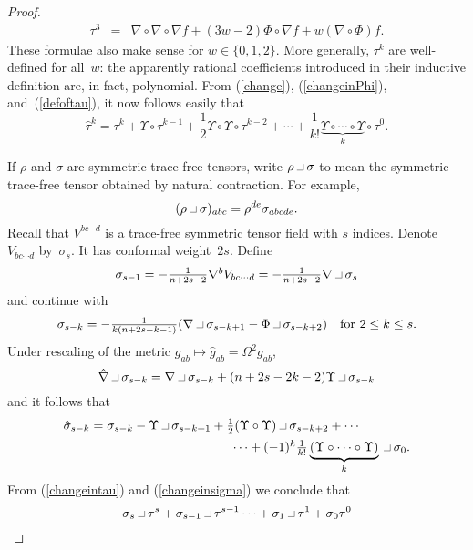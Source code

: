 \documentclass[a4paper,12pt]{amsart}
\newcommand{\intprod}{\makebox[10pt]{\rule{5pt}{.3pt}\rule{.3pt}{5pt}}}
\begin{document}
\begin{proof}
\begin{equation}
\begin{array}{rcl}
\tau^3&=&
\nabla\circ\nabla\circ\nabla f+(3w-2)\Phi\circ\nabla f+w(\nabla\circ\Phi)f.
\end{array}\end{equation}
These formulae also make sense for $w\in\{0,1,2\}$. More generally, $\tau^k$
are well-defined for all~$w$: the apparently rational coefficients introduced
in their inductive definition are, in fact, polynomial. {From} (\ref{change}),
(\ref{changeinPhi}), and~(\ref{defoftau}), it now follows easily that
\begin{equation}\label{changeintau}
\textstyle \hat\tau^k=\tau^k+\Upsilon\circ\tau^{k-1}
+\frac{1}{2}\Upsilon\circ\Upsilon\circ\tau^{k-2}+\cdots
+\frac{1}{k!}\underbrace{\Upsilon\circ\cdots\circ\Upsilon}_k\circ\tau^0.
\end{equation}

If $\rho$ and $\sigma$ are symmetric trace-free tensors, write
$\rho\intprod\sigma$ to mean the symmetric trace-free tensor obtained by
natural contraction. For example,
$$(\rho\intprod\sigma)_{abc}=\rho^{de}\sigma_{abcde}.$$
Recall that $V^{bc\cdots d}$ is a trace-free symmetric tensor field with $s$
indices. Denote $V_{bc\cdots d}$ by~$\sigma_s$. It has conformal weight~$2s$.
Define
$$\textstyle\sigma_{s-1}=-\frac{1}{n+2s-2}\nabla^b V_{bc\cdots d}
=-\frac{1}{n+2s-2}\nabla\intprod\sigma_s$$
and continue with
\begin{equation}\label{defofsigma}\textstyle\sigma_{s-k}=
-\frac{1}{k(n+2s-k-1)}(\nabla\intprod\sigma_{s-k+1}
-\Phi\intprod\sigma_{s-k+2})\quad\mbox{for }2\leq k\leq s.\end{equation}
Under rescaling of the metric $g_{ab}\mapsto\hat g_{ab}=\Omega^2g_{ab}$,
$$\hat\nabla\intprod\sigma_{s-k}=
\nabla\intprod\sigma_{s-k}+(n+2s-2k-2)\Upsilon\intprod\sigma_{s-k}$$
and it follows that
\begin{equation}\label{changeinsigma}\begin{array}r
\textstyle \hat\sigma_{s-k}=\sigma_{s-k}-\Upsilon\intprod\sigma_{s-k+1}
+\frac{1}{2}(\Upsilon\circ\Upsilon)\intprod\sigma_{s-k+2}+\cdots
\qquad\qquad\\[5pt]
\cdots+
(-1)^k\frac{1}{k!}
\underbrace{(\Upsilon\circ\cdots\circ\Upsilon)}_k\intprod\sigma_0.
\end{array}\end{equation}
{From} (\ref{changeintau}) and (\ref{changeinsigma}) we conclude that
\begin{equation}\label{answer}\sigma_s\intprod\tau^s+
\sigma_{s-1}\intprod\tau^{s-1}\cdots+\sigma_1\intprod\tau^1+\sigma_0\tau^0
\end{equation}

\end{proof}
\end{document}
